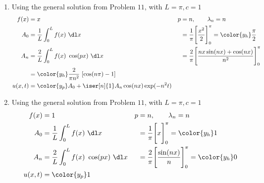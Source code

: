 \begin{enumerate}
    \item Using the general solution from Problem $ 11 $, with $ L = \pi, c = 1 $
          \begin{align}
              f(x)    & = x                                                       &
              p       & = n,\qquad \lambda_n = n                                    \\
              A_0     & = \frac{1}{L} \int_{0}^{L} f(x)\ \dl x                    &
                      & = \frac{1}{\pi} \Bigg[ \frac{x^2}{2} \Bigg]_0^\pi
              = \color{y_h} \frac{\pi}{2}                                           \\
              A_n     & = \frac{2}{L} \int_{0}^{L} f(x)\ \cos(px)\ \dl x          &
                      & = \frac{2}{\pi} \Bigg[ \frac{nx\sin(nx) + \cos(nx)}{n^2}
              \Bigg]_0^\pi                                                          \\
                      & = \color{y_h} \frac{2}{\pi n^2}\ [\cos(n\pi) - 1]           \\
              u(x, t) & = \color{y_p} A_0 + \iser[n]{1} A_n \cos(nx) \exp(-n^2 t)
          \end{align}

    \item Using the general solution from Problem $ 11 $, with $ L = \pi, c = 1 $
          \begin{align}
              f(x)    & = 1                                                    &
              p       & = n,\qquad \lambda_n = n                                 \\
              A_0     & = \frac{1}{L} \int_{0}^{L} f(x)\ \dl x                 &
                      & = \frac{1}{\pi} \Bigg[ x \Bigg]_0^\pi
              = \color{y_h} 1                                                    \\
              A_n     & = \frac{2}{L} \int_{0}^{L} f(x)\ \cos(px)\ \dl x       &
                      & = \frac{2}{\pi} \Bigg[ \frac{\sin(nx)}{n} \Bigg]_0^\pi
              = \color{y_h} 0                                                    \\
              u(x, t) & = \color{y_p} 1
          \end{align}


\end{enumerate}
